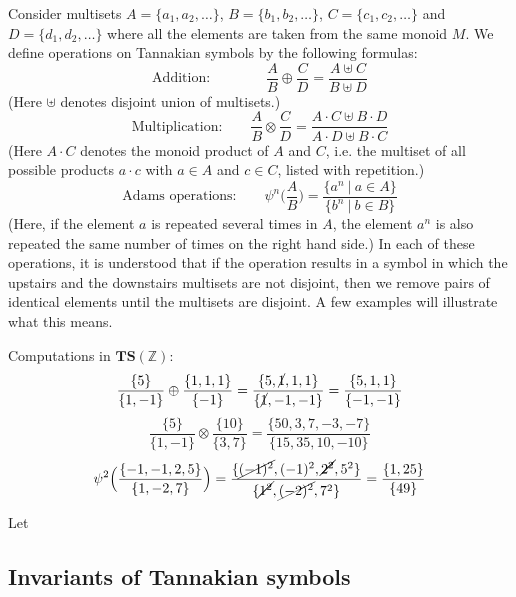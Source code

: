 Consider multisets $A = \{a_1, a_2, \ldots\}$, $B = \{b_1, b_2, \ldots\}$, $C = \{c_1, c_2, \ldots\}$ and $D = \{ d_1, d_2, \ldots \}$ where all the elements are taken from the same monoid $M$. We define operations on Tannakian symbols by the following formulas:
$$ \textrm{Addition:} \qquad \qquad \frac{A}{B} \oplus \frac{C}{D} = \frac{A \uplus C}{B \uplus D}  $$
(Here $\uplus$ denotes disjoint union of multisets.)
$$ \textrm{Multiplication:} \qquad \frac{A}{B} \otimes \frac{C}{D} = \frac{ A \cdot C \uplus B \cdot D }{ A \cdot D \uplus B \cdot C }  $$
(Here $A \cdot C$ denotes the monoid product of $A$ and $C$, i.e. the multiset of all possible products $a \cdot c$ with $a \in A$ and $c \in C$, listed with repetition.)
$$  \textrm{Adams operations:} \qquad \psi^n \Big( \frac{A}{B} \Big) = \frac{\{a^n \ \vert \ a \in A \}}{\{b^n \ \vert \ b \in B \}}    $$ 
(Here, if the element $a$ is repeated several times in $A$, the element $a^n$ is also repeated the same number of times on the right hand side.)
In each of these operations, it is understood that if the operation results in a symbol in which the upstairs and the downstairs multisets are not disjoint, then we remove pairs of identical elements until the multisets are disjoint. A few examples will illustrate what this means.
\begin{example} Computations in $\mathbf{TS}(\mathbb{Z})$:
$$\frac{ \{ 5\} }{ \{ 1, -1 \} } \oplus \frac{  \{ 1, 1, 1 \}  }{  \{ -1 \}  } = \frac{  \{ 5, \cancel{1}, 1, 1 \}   }{  \{ \cancel{1}, -1, -1 \} } = \frac{  \{ 5, 1, 1 \}   }{  \{  -1, -1 \} } $$
$$\frac{ \{ 5\} }{ \{ 1, -1 \} } \otimes \frac{ \{ 10 \} }{  \{ 3, 7 \}  } = \frac{  \{ 50, 3, 7, -3, -7 \}   }{  \{ 15, 35, 10, -10 \} }  $$
$$ \psi^2 \Big( \frac{ \{  -1, -1, 2, 5 \} }{ \{  1, -2, 7\} } \Big) =  \frac{ \{  \cancel{(-1)^2}, (-1)^2, \cancel{2^2}, 5^2 \} }{ \{  \cancel{1^2}, \cancel{(-2)^2}, 7^2 \} } = \frac{ \{  1, 25 \} }{ \{  49 \} } $$
\end{example}


\begin{theorem}
Let 
\end{theorem}



\subsection{Invariants of Tannakian symbols}

